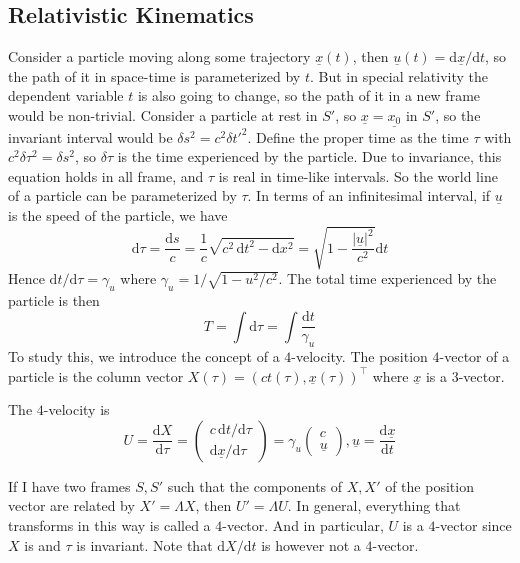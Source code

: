 \subsection{Relativistic Kinematics}
Consider a particle moving along some trajectory $\underline{x}(t)$, then $\underline{u}(t)=\mathrm d\underline{x}/\mathrm dt$, so the path of it in space-time is parameterized by $t$.
But in special relativity the dependent variable $t$ is also going to change, so the path of it in a new frame would be non-trivial.
Consider a particle at rest in $S'$, so $\underline{x}=\underline{x_0}$ in $S'$, so the invariant interval would be $\delta s^2=c^2\delta t'^2$.
Define the proper time as the time $\tau$ with $c^2\delta\tau^2=\delta s^2$, so $\delta\tau$ is the time experienced by the particle.
Due to invariance, this equation holds in all frame, and $\tau$ is real in time-like intervals.
So the world line of a particle can be parameterized by $\tau$.
In terms of an infinitesimal interval, if $\underline{u}$ is the speed of the particle, we have
$$\mathrm d\tau=\frac{\mathrm ds}{c}=\frac{1}{c}\sqrt{c^2\,\mathrm dt^2-\mathrm dx^2}=\sqrt{1-\frac{|\underline{u}|^2}{c^2}}\mathrm dt$$
Hence $\mathrm dt/\mathrm d\tau=\gamma_u$ where $\gamma_u=1/\sqrt{1-u^2/c^2}$.
The total time experienced by the particle is then
$$T=\int\mathrm d\tau=\int\frac{\mathrm dt}{\gamma_u}$$
To study this, we introduce the concept of a $4$-velocity.
The position $4$-vector of a particle is the column vector $X(\tau)=(ct(\tau),\underline{x}(\tau))^\top$ where $\underline{x}$ is a $3$-vector.
\begin{definition}
    The $4$-velocity is
    $$U=\frac{\mathrm dX}{\mathrm d\tau}=\begin{pmatrix}
        c\,\mathrm dt/\mathrm d\tau\\
        \mathrm d\underline{x}/\mathrm d\tau
    \end{pmatrix}=\gamma_u\begin{pmatrix}
        c\\
        \underline{u}
    \end{pmatrix},\underline{u}=\frac{\mathrm d\underline{x}}{\mathrm dt}$$
\end{definition}
If I have two frames $S,S'$ such that the components of $X,X'$ of the position vector are related by $X'=\Lambda X$, then $U'=\Lambda U$.
In general, everything that transforms in this way is called a $4$-vector.
And in particular, $U$ is a $4$-vector since $X$ is and $\tau$ is invariant.
Note that $\mathrm dX/\mathrm dt$ is however not a $4$-vector.
